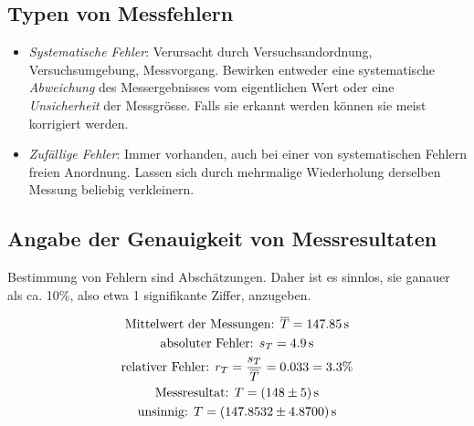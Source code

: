 \subsection{Typen von Messfehlern}

\begin{itemize}
    \item
        \emph{Systematische   Fehler}: Verursacht  durch   Versuchsandordnung,
        Versuchsumgebung,  Messvorgang. Bewirken  entweder eine  systematische
        \emph{Abweichung}  des  Messergebnisses  vom  eigentlichen  Wert  oder
        eine  \emph{Unsicherheit} der  Messgr\"osse. Falls sie  erkannt werden
        k\"onnen sie meist korrigiert werden.
    \item
        \emph{Zuf\"allige  Fehler}: Immer   vorhanden,  auch  bei   einer  von
        systematischen Fehlern freien  Anordnung. Lassen sich durch mehrmalige
        Wiederholung derselben Messung beliebig verkleinern.
\end{itemize}


\subsection{Angabe der Genauigkeit von Messresultaten}

Bestimmung von Fehlern sind Absch\"atzungen. Daher ist es sinnlos, sie ganauer
als ca. 10\%, also etwa 1 signifikante Ziffer, anzugeben.

\begin{gather*}
    \text{Mittelwert der Messungen: }\overline{T} = \SI{147.85}{\second} \\
    \text{absoluter Fehler: }                 s_T = \SI{4.9}{\second} \\
    \text{relativer Fehler: }                 r_T = \frac{s_T}{\overline{T}} = \num{0.033} = 3.3\% \\
    \text{Messresultat: }                       T = \SI[separate-uncertainty = true]{148 +- 5}{\second} \\
    \text{unsinnig: }                           T = \SI[separate-uncertainty = true]{147.8532 +- 4.87}{\second}
\end{gather*}


